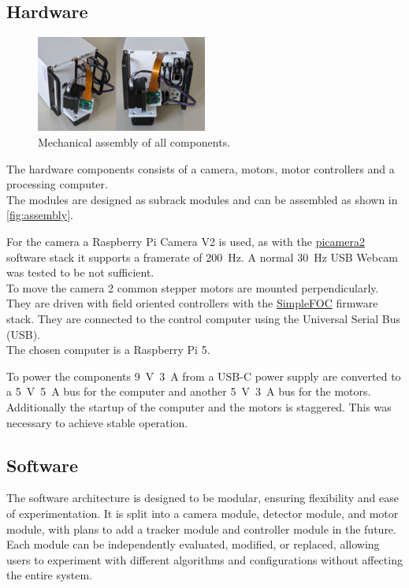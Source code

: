 \documentclass[
    parskip=half, 
    twoside=false,
    twocolumn=true,
    fontsize=12pt,
]{scrarticle}
\begin{document}
\subsection*{Hardware}
\begin{figure}
    \centering
    \includegraphics[width=0.5\textwidth]{../../hardware/assembly.png}
    \caption{Mechanical assembly of all components.}
    \label{fig:assembly}
\end{figure}
The hardware components consists of a camera, motors, motor controllers and a processing computer.\\
The modules are designed as subrack modules and can be assembled as shown in \autoref{fig:assembly}.


For the camera a Raspberry Pi Camera V2 is used, as with the \href{https://github.com/raspberrypi/picamera2}{picamera2} software stack it supports a framerate of \SI{200}{Hz}.
A normal \SI{30}{Hz} USB Webcam was tested to be not sufficient.\\
To move the camera 2 common stepper motors are mounted perpendicularly.
They are driven with field oriented controllers with the \href{https://simplefoc.com/}{SimpleFOC} firmware stack.
They are connected to the control computer using the Universal Serial Bus (USB).\\
The chosen computer is a Raspberry Pi 5.

To power the components \SI{9}{V}~\SI{3}{A} from a USB-C power supply are converted to a \SI{5}{V}~\SI{5}{A} bus for the computer and another \SI{5}{V}~\SI{3}{A} bus for the motors.
Additionally the startup of the computer and the motors is staggered.
This was necessary to achieve stable operation.

\subsection*{Software}
The software architecture is designed to be modular, ensuring flexibility and ease of experimentation. It is split into a camera module, detector module, and motor module, with plans to add a tracker module and controller module in the future. Each module can be independently evaluated, modified, or replaced, allowing users to experiment with different algorithms and configurations without affecting the entire system.
\end{document}
